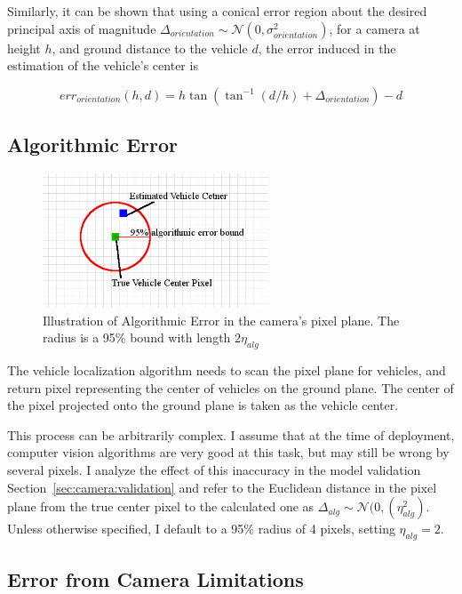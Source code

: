 \documentclass[a4paper,12pt,twoside,openright]{report}
\begin{document}
Similarly, it can be shown that using a conical error region about the desired principal axis
of magnitude $\Delta_{orientation} \sim \mathcal{N}(0,\sigma_{orientation}^2)$, 
for a camera at height $h$, and ground distance to the vehicle $d$, the
error induced in the estimation of the vehicle's center is 

\[ err_{orientation}(h, d) = h\tan(\tan^{-1}(d/h) + \Delta_{orientation}) - d \] %




\subsection{Algorithmic Error}

\begin{figure}[h]
    \centering
    \includegraphics[width=0.6\textwidth]{figures/camera/alg_error.png}
    \caption[Algorithmic Error]{Illustration of Algorithmic Error in the camera's pixel plane. The radius is a 95\% bound
    with length $2\eta_{alg}$}
\end{figure}

The vehicle localization algorithm needs to scan the pixel plane for vehicles,
and return pixel representing the center of vehicles on the ground plane.
The center of the pixel projected onto the ground plane is taken as the vehicle center.

This process can be arbitrarily complex. I assume that at the time of deployment, 
computer vision algorithms are very good at this task, but may still
be wrong by several pixels. I analyze the effect of this inaccuracy
in the model validation Section~\ref{sec:camera:validation} and refer to the Euclidean distance
in the pixel plane from the true center pixel to the calculated one
as $\Delta_{alg} \sim \mathcal{N}(0, (\eta_{alg}^2)$. Unless otherwise specified,
I default to a 95\% radius of 4 pixels, setting $\eta_{alg}=2$.

\subsection{Error from Camera Limitations}
\end{document}

